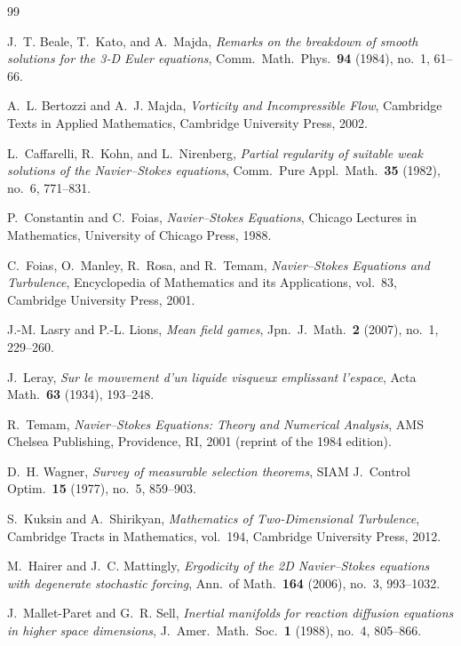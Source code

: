 \documentclass[12pt,a4paper]{article}
\theoremstyle{definition}
\theoremstyle{plain}
\theoremstyle{remark}
\begin{document}
\begin{thebibliography}{99}

J.~T. Beale, T.~Kato, and A.~Majda,
\emph{Remarks on the breakdown of smooth solutions for the 3-D Euler equations},
Comm.\ Math.\ Phys.\ \textbf{94} (1984), no.~1, 61--66.

A.~L. Bertozzi and A.~J. Majda,
\emph{Vorticity and Incompressible Flow},
Cambridge Texts in Applied Mathematics, Cambridge University Press, 2002.

L.~Caffarelli, R.~Kohn, and L.~Nirenberg,
\emph{Partial regularity of suitable weak solutions of the Navier--Stokes equations},
Comm.\ Pure Appl.\ Math.\ \textbf{35} (1982), no.~6, 771--831.

P.~Constantin and C.~Foias,
\emph{Navier--Stokes Equations},
Chicago Lectures in Mathematics, University of Chicago Press, 1988.

C.~Foias, O.~Manley, R.~Rosa, and R.~Temam,
\emph{Navier--Stokes Equations and Turbulence},
Encyclopedia of Mathematics and its Applications, vol.~83, Cambridge University Press, 2001.

J.-M. Lasry and P.-L. Lions,
\emph{Mean field games},
Jpn.\ J.\ Math.\ \textbf{2} (2007), no.~1, 229--260.

J.~Leray,
\emph{Sur le mouvement d'un liquide visqueux emplissant l'espace},
Acta Math.\ \textbf{63} (1934), 193--248.

R.~Temam,
\emph{Navier--Stokes Equations: Theory and Numerical Analysis},
AMS Chelsea Publishing, Providence, RI, 2001 (reprint of the 1984 edition).

D.~H. Wagner,
\emph{Survey of measurable selection theorems},
SIAM J.\ Control Optim.\ \textbf{15} (1977), no.~5, 859--903.

S.~Kuksin and A.~Shirikyan,
\emph{Mathematics of Two-Dimensional Turbulence},
Cambridge Tracts in Mathematics, vol.~194, Cambridge University Press, 2012.

M.~Hairer and J.~C. Mattingly,
\emph{Ergodicity of the 2D Navier--Stokes equations with degenerate stochastic forcing},
Ann.\ of Math.\ \textbf{164} (2006), no.~3, 993--1032.

J.~Mallet-Paret and G.~R. Sell,
\emph{Inertial manifolds for reaction diffusion equations in higher space dimensions},
J.~Amer.\ Math.\ Soc.\ \textbf{1} (1988), no.~4, 805--866.


\end{thebibliography}
\end{document}
